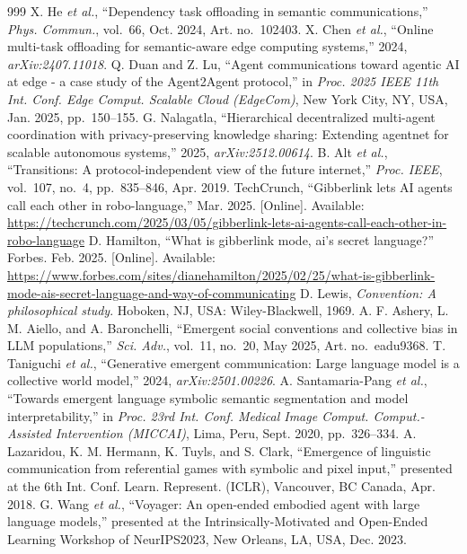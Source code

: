 \begin{thebibliography}{999}
 X. He \emph{et al.}, ``Dependency task offloading in semantic communications,'' \emph{Phys. Commun.}, vol.~66, Oct. 2024, Art. no.~102403.
 X. Chen \emph{et al.}, ``Online multi-task offloading for semantic-aware edge computing systems,'' 2024, \emph{arXiv:2407.11018}.
 Q. Duan and Z. Lu, ``Agent communications toward agentic AI at edge - a case study of the Agent2Agent protocol,'' in \emph{Proc. 2025 IEEE 11th Int. Conf. Edge Comput. Scalable Cloud (EdgeCom)}, New York City, NY, USA, Jan. 2025, pp.~150--155.
 G. Nalagatla, ``Hierarchical decentralized multi-agent coordination with privacy-preserving knowledge sharing: Extending agentnet for scalable autonomous systems,'' 2025, \emph{arXiv:2512.00614}.
 B. Alt \emph{et al.}, ``Transitions: A protocol-independent view of the future internet,'' \emph{Proc. IEEE}, vol.~107, no.~4, pp.~835--846, Apr. 2019.
 TechCrunch, ``Gibberlink lets AI agents call each other in robo-language,'' Mar. 2025. [Online]. Available: \url{https://techcrunch.com/2025/03/05/gibberlink-lets-ai-agents-call-each-other-in-robo-language}
 D. Hamilton, ``What is gibberlink mode, ai's secret language?'' Forbes. Feb. 2025. [Online]. Available: \url{https://www.forbes.com/sites/dianehamilton/2025/02/25/what-is-gibberlink-mode-ais-secret-language-and-way-of-communicating}
 D. Lewis, \emph{Convention: A philosophical study}. Hoboken, NJ, USA: Wiley-Blackwell, 1969.
 A. F. Ashery, L. M. Aiello, and A. Baronchelli, ``Emergent social conventions and collective bias in LLM populations,'' \emph{Sci. Adv.}, vol.~11, no.~20, May 2025, Art. no.~eadu9368.
 T. Taniguchi \emph{et al.}, ``Generative emergent communication: Large language model is a collective world model,'' 2024, \emph{arXiv:2501.00226}.
 A. Santamaria-Pang \emph{et al.}, ``Towards emergent language symbolic semantic segmentation and model interpretability,'' in \emph{Proc. 23rd Int. Conf. Medical Image Comput. Comput.-Assisted Intervention (MICCAI)}, Lima, Peru, Sept. 2020, pp.~326--334.
 A. Lazaridou, K. M. Hermann, K. Tuyls, and S. Clark, ``Emergence of linguistic communication from referential games with symbolic and pixel input,'' presented at the 6th Int. Conf. Learn. Represent. (ICLR), Vancouver, BC Canada, Apr. 2018.
 G. Wang \emph{et al.}, ``Voyager: An open-ended embodied agent with large language models,'' presented at the Intrinsically-Motivated and Open-Ended Learning Workshop of NeurIPS2023, New Orleans, LA, USA, Dec. 2023.

\end{thebibliography}

